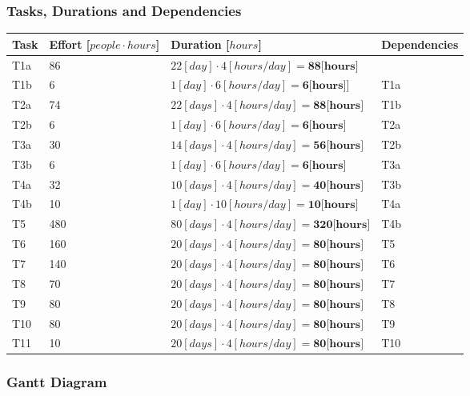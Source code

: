 \subsubsection{Tasks, Durations and Dependencies}
\lipsum[100]
\begin{center}
	\begin{tabulary}{\linewidth\tymin=70pt}{Y{1cm}|Y{2.5cm}|Y{4cm}|Y{2.5cm}}
		\textbf{Task} & \textbf{Effort [$people \cdot hours$]} & \textbf{Duration [$hours$]} & \textbf{Dependencies} \\ \hline
		T1a &  86 & $22[day] \cdot 4[hours/day] = \textbf{88[hours]}$  & \\ \hline
		T1b & 6 & $1[day] \cdot 6[hours/day] = \textbf{6[hours]}$] & T1a \\ \hline
		T2a & 74 & $22[days] \cdot 4[hours/day] = \textbf{88[hours]}$ & T1b \\ \hline
		T2b & 6 & $1[day] \cdot 6[hours/day] = \textbf{6[hours]}$ & T2a \\ \hline
		T3a & 30 & $14[days] \cdot 4[hours/day] = \textbf{56[hours]}$ & T2b \\ \hline
		T3b & 6 & $1[day] \cdot 6[hours/day] = \textbf{6[hours]}$ & T3a \\ \hline
		T4a & 32 & $10[days] \cdot 4[hours/day] = \textbf{40[hours]}$ & T3b \\ \hline
		T4b & 10 & $1[day] \cdot 10[hours/day] = \textbf{10[hours]}$ & T4a \\ \hline
		T5 & 480 & $80[days] \cdot 4[hours/day] = \textbf{320[hours]}$ & T4b \\ \hline
		T6 & 160 & $20[days] \cdot 4[hours/day] = \textbf{80[hours]}$ & T5 \\ \hline
		T7 & 140 & $20[days] \cdot 4[hours/day] = \textbf{80[hours]}$ & T6 \\ \hline
		T8 & 70 & $20[days] \cdot 4[hours/day] = \textbf{80[hours]}$ & T7 \\ \hline
		T9 & 80 & $20[days] \cdot 4[hours/day] = \textbf{80[hours]}$ & T8 \\ \hline
		T10 & 80 & $20[days] \cdot 4[hours/day] = \textbf{80[hours]}$ & T9 \\ \hline
		T11 & 10 & $20[days] \cdot 4[hours/day] = \textbf{80[hours]}$ & T10 \\ \hline
	\end{tabulary}
\end{center}
%
\subsubsection{Gantt Diagram}
\lipsum[100]
\begin{center}
	\begin{ganttchart}[hgrid=true,vgrid={draw=none, dotted}, x unit=4mm]{1}{24}
		 \\
		 \\
		 \\
		 \\
		 \\
	\end{ganttchart}
\end{center}
%